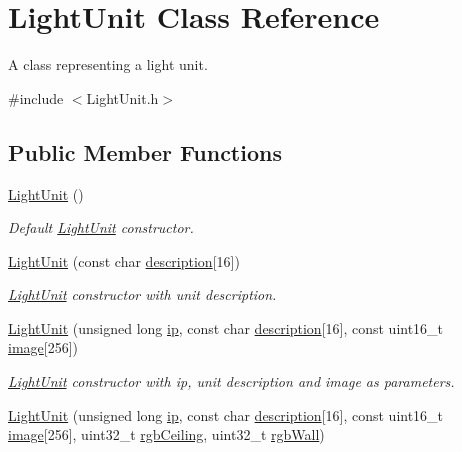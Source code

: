 \hypertarget{classLightUnit}{}\section{Light\+Unit Class Reference}
\label{classLightUnit}


A class representing a light unit.  




{\ttfamily \#include $<$Light\+Unit.\+h$>$}

\subsection*{Public Member Functions}
\begin{DoxyCompactItemize}
\item 
\mbox{\label{classLightUnit_a28169090402e0a891c35a881760e14bd}} 
\mbox{\hyperlink{classLightUnit_a28169090402e0a891c35a881760e14bd}{Light\+Unit}} ()
\begin{DoxyCompactList}\small\item\em Default \mbox{\hyperlink{classLightUnit}{Light\+Unit}} constructor. \end{DoxyCompactList}\item 
\mbox{\hyperlink{classLightUnit_aa44c2d7b6e764c9bbca0f5ab19a31553}{Light\+Unit}} (const char \mbox{\hyperlink{classLightUnit_aad36ad5ba65b93a30ee35ef1f6895b5a}{description}}\mbox{[}16\mbox{]})
\begin{DoxyCompactList}\small\item\em \mbox{\hyperlink{classLightUnit}{Light\+Unit}} constructor with unit description. \end{DoxyCompactList}\item 
\mbox{\hyperlink{classLightUnit_afb696351f25e3766eb18d6ce31f97fa6}{Light\+Unit}} (unsigned long \mbox{\hyperlink{classLightUnit_a7d490bbccb134d200628eee46ab8fb3d}{ip}}, const char \mbox{\hyperlink{classLightUnit_aad36ad5ba65b93a30ee35ef1f6895b5a}{description}}\mbox{[}16\mbox{]}, const uint16\+\_\+t \mbox{\hyperlink{classLightUnit_a01f65fda0c55ecd8b1d62911cfa688d2}{image}}\mbox{[}256\mbox{]})
\begin{DoxyCompactList}\small\item\em \mbox{\hyperlink{classLightUnit}{Light\+Unit}} constructor with ip, unit description and image as parameters. \end{DoxyCompactList}\item 
\mbox{\hyperlink{classLightUnit_ab91f948d033d6982b4b981aea104b1d7}{Light\+Unit}} (unsigned long \mbox{\hyperlink{classLightUnit_a7d490bbccb134d200628eee46ab8fb3d}{ip}}, const char \mbox{\hyperlink{classLightUnit_aad36ad5ba65b93a30ee35ef1f6895b5a}{description}}\mbox{[}16\mbox{]}, const uint16\+\_\+t \mbox{\hyperlink{classLightUnit_a01f65fda0c55ecd8b1d62911cfa688d2}{image}}\mbox{[}256\mbox{]}, uint32\+\_\+t \mbox{\hyperlink{classLightUnit_ae688f610193b69a2f390bd2a44dc2a7c}{rgb\+Ceiling}}, uint32\+\_\+t \mbox{\hyperlink{classLightUnit_a9927e4bcf968e043883688e87935fb4a}{rgb\+Wall}})

\end{DoxyCompactItemize}
